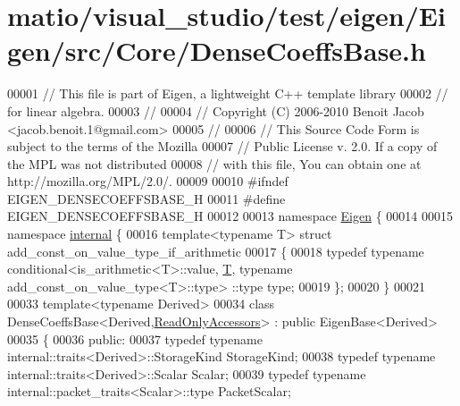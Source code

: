 \hypertarget{matio_2visual__studio_2test_2eigen_2_eigen_2src_2_core_2_dense_coeffs_base_8h_source}{}\section{matio/visual\+\_\+studio/test/eigen/\+Eigen/src/\+Core/\+Dense\+Coeffs\+Base.h}
\label{matio_2visual__studio_2test_2eigen_2_eigen_2src_2_core_2_dense_coeffs_base_8h_source}

\begin{DoxyCode}
00001 \textcolor{comment}{// This file is part of Eigen, a lightweight C++ template library}
00002 \textcolor{comment}{// for linear algebra.}
00003 \textcolor{comment}{//}
00004 \textcolor{comment}{// Copyright (C) 2006-2010 Benoit Jacob <jacob.benoit.1@gmail.com>}
00005 \textcolor{comment}{//}
00006 \textcolor{comment}{// This Source Code Form is subject to the terms of the Mozilla}
00007 \textcolor{comment}{// Public License v. 2.0. If a copy of the MPL was not distributed}
00008 \textcolor{comment}{// with this file, You can obtain one at http://mozilla.org/MPL/2.0/.}
00009 
00010 \textcolor{preprocessor}{#ifndef EIGEN\_DENSECOEFFSBASE\_H}
00011 \textcolor{preprocessor}{#define EIGEN\_DENSECOEFFSBASE\_H}
00012 
00013 \textcolor{keyword}{namespace }\hyperlink{namespace_eigen}{Eigen} \{
00014 
00015 \textcolor{keyword}{namespace }\hyperlink{namespaceinternal}{internal} \{
00016 \textcolor{keyword}{template}<\textcolor{keyword}{typename} T> \textcolor{keyword}{struct }add\_const\_on\_value\_type\_if\_arithmetic
00017 \{
00018   \textcolor{keyword}{typedef} \textcolor{keyword}{typename} conditional<is\_arithmetic<T>::value, \hyperlink{group___sparse_core___module_class_eigen_1_1_triplet}{T}, \textcolor{keyword}{typename} add\_const\_on\_value\_type<T>::type>
      ::type type;
00019 \};
00020 \}
00021 
00033 \textcolor{keyword}{template}<\textcolor{keyword}{typename} Derived>
00034 \textcolor{keyword}{class }DenseCoeffsBase<Derived,\hyperlink{group__enums_gga9f93eac38eb83deb0e8dbd42ddf11d5da42865f87356ad7e585a1bfbfd1b81699}{ReadOnlyAccessors}> : \textcolor{keyword}{public} EigenBase<Derived>
00035 \{
00036   \textcolor{keyword}{public}:
00037     \textcolor{keyword}{typedef} \textcolor{keyword}{typename} internal::traits<Derived>::StorageKind StorageKind;
00038     \textcolor{keyword}{typedef} \textcolor{keyword}{typename} internal::traits<Derived>::Scalar Scalar;
00039     \textcolor{keyword}{typedef} \textcolor{keyword}{typename} internal::packet\_traits<Scalar>::type PacketScalar;

\end{DoxyCode}

